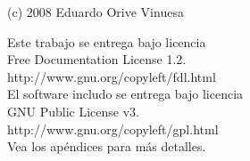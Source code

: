 \thispagestyle{empty}
\vspace*{15cm}

\begin{flushright}
(c) 2008 Eduardo Orive Vinuesa


Este trabajo se entrega bajo licencia \\
Free Documentation License 1.2.\\
http://www.gnu.org/copyleft/fdl.html\\

El software includo se entrega bajo licencia \\
GNU Public License v3.\\
http://www.gnu.org/copyleft/gpl.html \\

Vea los apéndices para más detalles.
\end{flushright}
